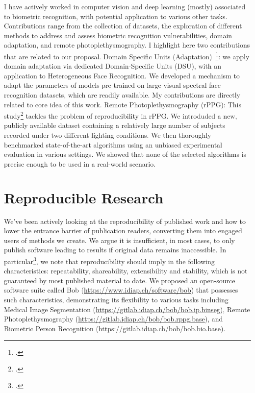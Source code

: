 \documentclass[a4paper,10pt,onecolumn]{article}
\begin{document}
I have actively worked in computer vision and deep learning (mostly) associated
to biometric recognition, with potential application to various other tasks.
Contributions range from the collection of datasets, the exploration of
different methods to address and assess biometric recognition vulnerabilities,
domain adaptation, and remote photoplethysmography.  I highlight here two
contributions that are related to our proposal.  Domain Specific Units
(Adaptation)~\footcite{tifs-2019}: we apply domain adaptation via dedicated
Domain-Specific Units (DSU), with an application to Heterogeneous Face
Recognition.  We developed a mechanism to adapt the parameters of models
pre-trained on large visual spectral face recognition datasets, which are
readily available.  My contributions are directly related to core idea of this
work.  Remote Photoplethysmography (rPPG):  This study\footcite{arxiv-2017-2}
tackles the problem of reproducibility in rPPG.  We introduded a new, publicly
available dataset containing a relatively large number of subjects recorded
under two different lighting conditions.  We then thoroughly benchmarked
state-of-the-art algorithms using an unbiased experimental evaluation in
various settings.  We showed that none of the selected algorithms is precise
enough to be used in a real-world scenario.

\section{Reproducible Research}

We've been actively looking at the reproducibility of published work and how to
lower the entrance barrier of publication readers, converting them into engaged
users of methods we create.  We argue it is insufficient, in most cases, to
only publish software leading to results if original data remains inaccessible.
In particular\footcite{icml-2017-1}, we note that reproducibility
should imply in the following characteristics: repeatability, shareability,
extensibility and stability, which is not guaranteed by most published material
to date.  We proposed an open-source software suite called Bob
(\url{https://www.idiap.ch/software/bob}) that possesses such characteristics,
demonstrating its flexibility to various tasks including Medical Image
Segmentation (\url{https://gitlab.idiap.ch/bob/bob.ip.binseg}), Remote
Photoplethysmography (\url{https://gitlab.idiap.ch/bob/bob.rppg.base}), and
Biometric Person Recognition (\url{https://gitlab.idiap.ch/bob/bob.bio.base}).
\end{document}
